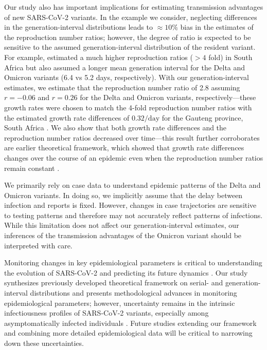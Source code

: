 \documentclass[12pt]{article}
\begin{document}
Our study also has important implications for estimating transmission advantages of new SARS-CoV-2 variants.
In the example we consider, neglecting differences in the generation-interval distributions leads to $\approx 10\%$ bias in the estimates of the reproduction number ratios; however, the degree of ratio is expected to be sensitive to the assumed generation-interval distribution of the resident variant.
For example, \cite{pearson2021bounding} estimated a much higher reproduction ratios ($> 4$ fold) in South Africa but also assumed a longer mean generation interval for the Delta and Omicron variants (6.4 vs 5.2 days, respectively).
With our generation-interval estimates, we estimate that the reproduction number ratio of 2.8 assuming $r=-0.06$ and $r=0.26$ for the Delta and Omicron variants, respectively---these growth rates were chosen to match the 4-fold reproduction number ratios with the estimated growth rate differences of $0.32/\mathrm{day}$ for the Gauteng province, South Africa \cite{pearson2021bounding}.
We also show that both growth rate differences and the reproduction number ratios decreased over time---this result further corroborates are earlier theoretical framework, which showed that growth rate differences changes over the course of an epidemic even when the reproduction number ratios remain constant \citep{park2021roles}.

We primarily rely on case data to understand epidemic patterns of the Delta and Omicron variants.
In doing so, we implicitly assume that the delay between infection and reports is fixed.
However, changes in case trajectories are sensitive to testing patterns and therefore may not accurately reflect patterns of infections.
While this limitation does not affect our generation-interval estimates, our inferences of the transmission advantages of the Omicron variant should be interpreted with care.

Monitoring changes in key epidemiological parameters is critical to understanding the evolution of SARS-CoV-2 and predicting its future dynamics \citep{kraemer2021monitoring}.
Our study synthesizes previously developed theoretical framework on serial- and generation-interval distributions and presents methodological advances in monitoring epidemiological parameters;
however, uncertainty remains in the intrinsic infectiousness profiles of SARS-CoV-2 variants, especially among asymptomatically infected individuals \citep{park2020time}.
Future studies extending our framework and combining more detailed epidemiological data will be critical to narrowing down these uncertainties.

\pagebreak


\end{document}
